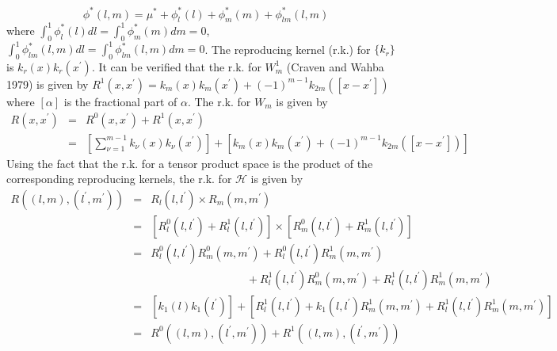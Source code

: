 \documentclass[12pt]{article}
\theoremstyle{definition}
\begin{document}
\begin{equation}
\phi^*\left(l,m\right) = \mu^* + \phi_l^*\left(l\right) + \phi_m^*\left(m\right) + \phi_{lm}^*\left(l,m\right)  \label{eq:ANOVAdecomp}
\end{equation} 
\noindent
where $\int_{0}^1 \phi^*_{l}\left(l\right)dl = \int_{0}^1 \phi^*_{m}\left(m\right)dm = 0$, $\int_{0}^1 \phi^*_{lm}\left(l,m\right)dl = \int_{0}^1 \phi^*_{lm}\left(l,m\right)dm = 0$. The reproducing kernel (r.k.) for $\lbrace k_r \rbrace$ is $k_r\left(x \right)k_r\left(x^\prime \right)$. It can be verified that the r.k. for $W_m^1$ (Craven and Wahba 1979) is given by $R^1\left(x,x^\prime\right) = k_m\left(x \right)k_m\left(x^\prime \right) + \left( -1 \right)^{m-1}k_{2m}\left(\left[ x-x^\prime \right] \right)$
where $\left[ \alpha \right]$ is the fractional part of $\alpha$. The r.k. for $W_m$ is given by 
\begin{eqnarray*}
R\left(x,x^\prime\right) &=& R^0\left(x,x^\prime\right) + R^1\left(x,x^\prime\right) \\
&=&\left[ \sum_{\nu=1}^{m-1} k_\nu\left(x \right)k_\nu\left(x^\prime \right) \right]+ \left[ k_m\left(x \right)k_m\left(x^\prime \right) + \left( -1 \right)^{m-1}k_{2m}\left(\left[ x-x^\prime \right] \right)\right] \label{eq:RKforH1}
\end{eqnarray*}
\noindent
Using the fact that the r.k. for a tensor product space is the product of the corresponding reproducing kernels, the r.k. for $\mathcal{H}$ is given by 
\begin{eqnarray}
R\left( \left(l,m\right),\left(l^\prime,m^\prime\right)\right) &=&  R_l\left(l,l^\prime\right) \times R_m\left(m,m^\prime\right) \nonumber \\
 &=& \left[  R_l^0\left(l,l^\prime\right) + R_l^1\left(l,l^\prime\right) \right] \times \left[  R_m^0\left(l,l^\prime\right) + R_m^1\left(l,l^\prime\right) \right] \nonumber \\
 &=& R_l^0\left(l,l^\prime\right)R_m^0\left(m,m^\prime\right) + R_l^0\left(l,l^\prime\right) R_m^1\left(m,m^\prime\right) \nonumber \\
&\mbox{ }&\;\;\;\;\;\;\;\;\;\;\;\;\;\;\;\;\;\;\;\;\;\;\;\;\;\;\;\;\;\;\; +  R_l^1\left(l,l^\prime\right) R_m^0\left(m,m^\prime\right)  + R_l^1\left(l,l^\prime\right) R_m^1\left(m,m^\prime\right) \nonumber \\
&=& \left[ k_1\left(l \right)k_1\left(l^\prime \right)\right] + \left[ R_l^1\left(l,l^\prime\right)  + k_1\left(l,l^\prime\right) R_m^1\left(m,m^\prime\right) + R_l^1\left(l,l^\prime\right) R_m^1\left(m,m^\prime\right)\right] \nonumber \\
&=& R^0\left( \left(l,m\right) , \left(l^\prime,m^\prime \right) \right) + R^1\left( \left(l,m\right) , \left(l^\prime,m^\prime \right) \right)
\end{eqnarray}
\end{document}
